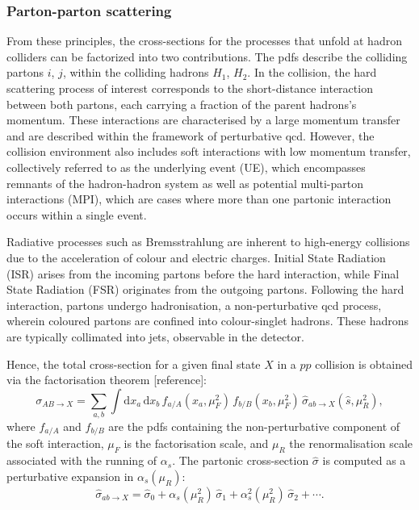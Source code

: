 \subsubsection*{Parton-parton scattering}
\label{subsubsec:proton}
From these principles, the cross-sections for the processes that unfold at hadron colliders can be factorized into two contributions. The \acrshort{pdf}s describe the colliding partons $i$, $j$, within the colliding hadrons $H_{1}$, $H_{2}$. In the collision, the hard scattering process of interest corresponds to the short-distance interaction between both partons, each carrying a fraction of the parent hadrons's momentum. These interactions are characterised by a large momentum transfer and are described within the framework of perturbative \acrshort{qcd}. However, the collision environment also includes soft interactions with low momentum transfer, collectively referred to as the underlying event (UE), which encompasses remnants of the hadron-hadron system as well as potential multi-parton interactions (MPI), which are cases where more than one partonic interaction occurs within a single event.

Radiative processes such as Bremsstrahlung are inherent to high-energy collisions due to the acceleration of colour and electric charges. Initial State Radiation (ISR) arises from the incoming partons before the hard interaction, while Final State Radiation (FSR) originates from the outgoing partons. Following the hard interaction, partons undergo hadronisation, a non-perturbative \acrshort{qcd} process, wherein coloured partons are confined into colour-singlet hadrons. These hadrons are typically collimated into jets, observable in the detector.

Hence, the total cross-section for a given final state $X$ in a $pp$ collision is obtained via the factorisation theorem [reference]:
\begin{equation}
\sigma_{AB \to X} = \sum_{a,b} \int \mathrm{d}x_a \, \mathrm{d}x_b \, f_{a/A}(x_a, \mu_F^2) \, f_{b/B}(x_b, \mu_F^2) \, \hat{\sigma}_{ab \to X}(\hat{s}, \mu_R^2),
\end{equation}
where $f_{a/A}$ and $f_{b/B}$ are the \acrshort{pdf}s containing the non-perturbative component of the soft interaction, $\mu_F$ is the factorisation scale, and $\mu_R$ the renormalisation scale associated with the running of $\alpha_s$. The partonic cross-section $\hat{\sigma}$ is computed as a perturbative expansion in $\alpha_s(\mu_R)$:
\begin{equation}
\hat{\sigma}_{ab \to X} = \hat{\sigma}_0 + \alpha_s(\mu_R^2)\, \hat{\sigma}_1 + \alpha_s^2(\mu_R^2)\, \hat{\sigma}_2 + \cdots.
\end{equation}

